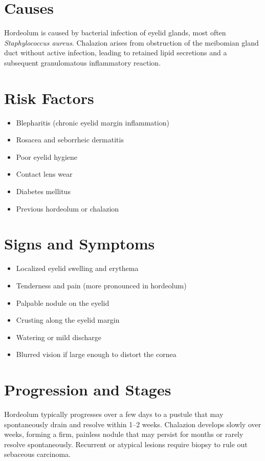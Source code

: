 \section{Causes}
Hordeolum is caused by bacterial infection of eyelid glands, most often \emph{Staphylococcus aureus}. Chalazion arises from obstruction of the meibomian gland duct without active infection, leading to retained lipid secretions and a subsequent granulomatous inflammatory reaction.

\section{Risk Factors}
\begin{itemize}[noitemsep]
  \item Blepharitis (chronic eyelid margin inflammation)
  \item Rosacea and seborrheic dermatitis
  \item Poor eyelid hygiene
  \item Contact lens wear
  \item Diabetes mellitus
  \item Previous hordeolum or chalazion
\end{itemize}

\section{Signs and Symptoms}
\begin{itemize}[noitemsep]
  \item Localized eyelid swelling and erythema
  \item Tenderness and pain (more pronounced in hordeolum)
  \item Palpable nodule on the eyelid
  \item Crusting along the eyelid margin
  \item Watering or mild discharge
  \item Blurred vision if large enough to distort the cornea
\end{itemize}

\section{Progression and Stages}
Hordeolum typically progresses over a few days to a pustule that may spontaneously drain and resolve within 1--2 weeks. Chalazion develops slowly over weeks, forming a firm, painless nodule that may persist for months or rarely resolve spontaneously. Recurrent or atypical lesions require biopsy to rule out sebaceous carcinoma.

